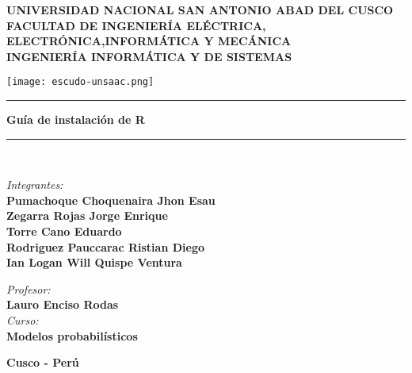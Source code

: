 \documentclass[a4paper]{article}
\begin{document}
\begin{titlepage}

\newcommand{\linea}{\rule{\linewidth}{0.7mm}} 
\center

\textbf{\Large UNIVERSIDAD NACIONAL SAN ANTONIO ABAD DEL CUSCO}\\[0.2cm]
\textbf{\Large FACULTAD DE INGENIERÍA ELÉCTRICA, ELECTRÓNICA,INFORMÁTICA Y MECÁNICA}\\[0.2cm]
\textbf{\Large INGENIERÍA INFORMÁTICA Y DE SISTEMAS\\[0.6cm]}

\texttt{[image: escudo-unsaac.png]}
\vfill

\linea
\vfill
\textbf{\LARGE Guía de instalación de R}\\[0.2cm]
\linea \\
\vfill

\textit{\Large Integrantes:}\\
    \vfill
    \textbf{\large Pumachoque Choquenaira Jhon Esau}\\[0.1cm]
    \textbf{\large Zegarra Rojas Jorge Enrique}\\[0.1cm]
    \textbf{\large Torre Cano Eduardo}\\[0.1cm]
    \textbf{\large Rodriguez Pauccarac Ristian Diego}\\[0.1cm]
    \textbf{\large Ian Logan Will Quispe Ventura}\\
    \vfill

\vspace{0.3cm}
    \textit{\Large Profesor:}\\
    \textbf{Lauro Enciso Rodas}\\
\vspace{0.5cm}
    \textit{\Large Curso:}\\
    \textbf{Modelos probabilísticos}\\
    \vfill

\vspace{0.5cm}
    \textbf{\Large Cusco - Perú }\\
    \newpage
    \end{titlepage}
\end{document}
